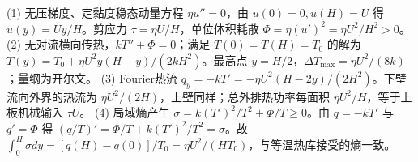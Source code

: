 (1) 无压梯度、定黏度稳态动量方程 \(\eta u''=0\)，由 \(u(0)=0,u(H)=U\) 得 \(u(y)=Uy/H\)。剪应力 \(\tau=\eta U/H\)，单位体积耗散 \(\Phi=\eta(u')^2=\eta U^2/H^2>0\)。
(2) 无对流横向传热，\(kT''+\Phi=0\)；满足 \(T(0)=T(H)=T_0\) 的解为 \(T(y)=T_0+\eta U^2y(H-y)/(2kH^2)\)。最高点 \(y=H/2\)，\(\Delta T_{\max}=\eta U^2/(8k)\)；量纲为开尔文。
(3) Fourier热流 \(q_y=-kT'=-\eta U^2(H-2y)/(2H^2)\)。下壁流向外界的热流为 \(\eta U^2/(2H)\)，上壁同样；总外排热功率每面积 \(\eta U^2/H\)，等于上板机械输入 \(\tau U\)。
(4) 局域熵产生 \(\sigma=k(T')^2/T^2+\Phi/T\ge0\)。由 \(q=-kT'\) 与 \(q'=\Phi\) 得 \((q/T)'=\Phi/T+k(T')^2/T^2=\sigma\)。故 \(\int_0^H\sigma dy=[q(H)-q(0)]/T_0=\eta U^2/(HT_0)\)，与等温热库接受的熵一致。
